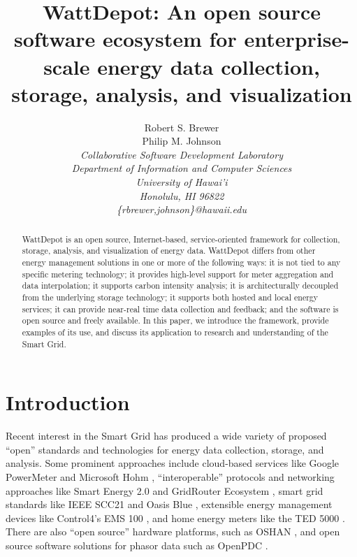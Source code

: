 \documentclass[conference,compsoc]{IEEEtran}
\begin{document}
\title{WattDepot: An open source software ecosystem for enterprise-scale
  energy data collection, storage, analysis, and visualization}

\author{Robert S. Brewer\\
        Philip M. Johnson \\
\em     Collaborative Software Development Laboratory \\
        Department of Information and Computer Sciences \\
        University of Hawai'i \\
        Honolulu, HI 96822 \\
        \{rbrewer,johnson\}@hawaii.edu \\
}


\maketitle

\begin{abstract}  %
  WattDepot is an open source, Internet-based, service-oriented framework 
  for collection, storage, analysis, and visualization of energy data.
  WattDepot differs from other energy management solutions in one or more
  of the following ways: it is not tied to any specific metering
  technology; it provides high-level support for meter aggregation and data
  interpolation; it supports carbon intensity analysis; it is
  architecturally decoupled from the underlying storage technology; it
  supports both hosted and local energy services; it can provide near-real
  time data collection and feedback; and the software is open source and
  freely available.  In this paper, we introduce the framework, provide
  examples of its use, and discuss its application to research and
  understanding of the Smart Grid.
\end{abstract}


\section{Introduction}
\label{sec:intro}

Recent interest in the Smart Grid has produced a wide variety of proposed
``open'' standards and technologies for energy data collection, storage,
and analysis.  Some prominent approaches include cloud-based services like
Google PowerMeter \cite{GooglePowerMeter} and Microsoft Hohm
\cite{MicrosoftHohm}, ``interoperable'' protocols and networking approaches
like Smart Energy 2.0 \cite{SmartEnergy2.0} and GridRouter Ecosystem
\cite{GridRouterEcosystem}, smart grid standards like IEEE SCC21
\cite{IEEESCC21} and Oasis Blue \cite{OasisBlue}, extensible energy
management devices like Control4's EMS 100 \cite{EMS100}, and home energy 
meters like the TED 5000 \cite{TED}.  There are also
``open source'' hardware platforms, such as OSHAN \cite{OSHAN}, and open
source software solutions for phasor data such as OpenPDC \cite{OpenPDC}.
\end{document}
